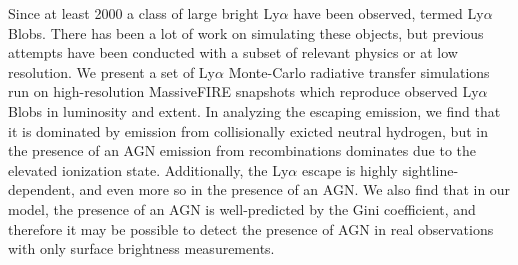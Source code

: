 Since at least 2000 a class of large bright Ly$\alpha$ have been observed, termed Ly$\alpha$ Blobs.
There has been a lot of work on simulating these objects, but previous attempts have been conducted with a subset of relevant physics or at low resolution.
We present a set of Ly$\alpha$ Monte-Carlo radiative transfer simulations run on high-resolution MassiveFIRE snapshots which reproduce observed Ly$\alpha$ Blobs in luminosity and extent.
In analyzing the escaping emission, we find that it is dominated by emission from collisionally exicted neutral hydrogen, but in the presence of an AGN emission from recombinations dominates due to the elevated ionization state.
Additionally, the Ly$\alpha$ escape is highly sightline-dependent, and even more so in the presence of an AGN.
We also find that in our model, the presence of an AGN is well-predicted by the Gini coefficient, and therefore it may be possible to detect the presence of AGN in real observations with only surface brightness measurements.
